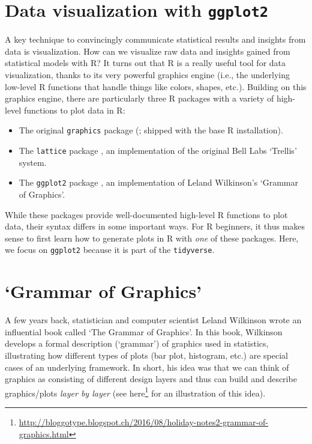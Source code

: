 \documentclass[
  12pt,
]{style/krantz}
\providecommand{\tightlist}{%
  \setlength{\itemsep}{0pt}\setlength{\parskip}{0pt}}
\renewcommand{\href}[2]{#2\footnote{\url{#1}}}
\begin{document}
\hypertarget{data-visualization-with-ggplot2}{%
\section{\texorpdfstring{Data visualization with \texttt{ggplot2}}{Data visualization with ggplot2}}\label{data-visualization-with-ggplot2}}

A key technique to convincingly communicate statistical results and insights from data is visualization. How can we visualize raw data and insights gained from statistical models with R? It turns out that R is a really useful tool for data visualization, thanks to its very powerful graphics engine (i.e., the underlying low-level R functions that handle things like colors, shapes, etc.). Building on this graphics engine, there are particularly three R packages with a variety of high-level functions to plot data in R:

\begin{itemize}
\tightlist
\item
  The original \texttt{graphics} package (\citet{r_2018}; shipped with the base R installation).
\item
  The \texttt{lattice} package \citep{lattice_2008}, an implementation of the original Bell Labs `Trellis' system.
\item
  The \texttt{ggplot2} package \citep{wickham_2016}, an implementation of Leland Wilkinson's `Grammar of Graphics'.
\end{itemize}

While these packages provide well-documented high-level R functions to plot data, their syntax differs in some important ways. For R beginners, it thus makes sense to first learn how to generate plots in R with \emph{one} of these packages. Here, we focus on \texttt{ggplot2} because it is part of the \texttt{tidyverse}.

\hypertarget{grammar-of-graphics}{%
\section{`Grammar of Graphics'}\label{grammar-of-graphics}}

A few years back, statistician and computer scientist Leland Wilkinson wrote an influential book called `The Grammar of Graphics'. In this book, Wilkinson develops a formal description (`grammar') of graphics used in statistics, illustrating how different types of plots (bar plot, histogram, etc.) are special cases of an underlying framework. In short, his idea was that we can think of graphics as consisting of different design layers and thus can build and describe graphics/plots \emph{layer by layer} (see \href{http://bloggotype.blogspot.ch/2016/08/holiday-notes2-grammar-of-graphics.html}{here} for an illustration of this idea).
\end{document}
